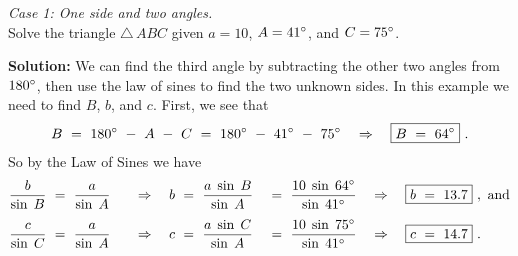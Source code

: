 \begin{exmp}
\noindent \emph{Case 1: One side and two angles.}\\Solve the triangle $\triangle\,ABC$ given $a = 10$, $A =
 41^\circ$, and $C = 75^\circ$.\vspace{1mm}
 \par\noindent\textbf{Solution:} We can
 find the third angle by subtracting the other two angles from $180^\circ$, then use the law
 of sines to find the two unknown sides. In this example we need to find $B$, $b$, and $c$. First,
 we see that
 \begin{displaymath}
  B ~=~ 180^\circ ~-~ A ~-~ C ~=~ 180^\circ ~-~ 41^\circ ~-~ 75^\circ \quad\Rightarrow\quad
  \boxed{B ~=~ 64^\circ} ~.
 \end{displaymath}
 So by the Law of Sines we have
 \begin{alignat*}{6}
  \frac{b}{\sin\;B} ~&=~ \frac{a}{\sin\;A} \quad&\Rightarrow\quad b ~&=~ \frac{a\;\sin\;B}{\sin\;A}
  ~&=~ \frac{10\;\sin\;64^\circ}{\sin\;41^\circ} \quad&\Rightarrow\quad \boxed{b ~=~ 13.7}
  ~,~\text{and}\\[4pt]
  \frac{c}{\sin\;C} ~&=~ \frac{a}{\sin\;A} \quad&\Rightarrow\quad c ~&=~ \frac{a\;\sin\;C}{\sin\;A}
  ~&=~ \frac{10\;\sin\;75^\circ}{\sin\;41^\circ} \quad&\Rightarrow\quad \boxed{c ~=~ 14.7} ~.
 \end{alignat*}
\end{exmp}\vspace{-4mm}
